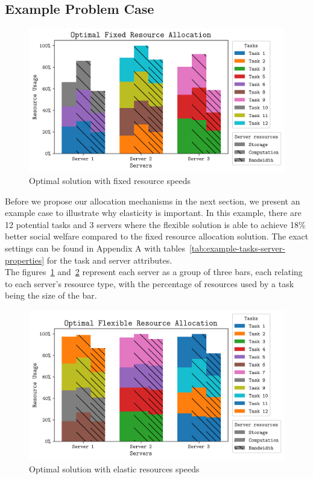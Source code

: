 \subsection{Example Problem Case}
\label{subsec:example-problem-case}
\begin{figure}
    \centering
    \includegraphics[width=\linewidth]{figs/allocation/optimal_fixed_resource_allocation.png}
    \caption{Optimal solution with fixed resource speeds}
    \label{fig:example-fixed-allocation}
\end{figure}
Before we propose our allocation mechanisms in the next section, we present an example case to illustrate
why elasticity is important. In this example, there are 12 potential tasks and 3 servers where the flexible solution
is able to achieve 18\% better social welfare compared to the fixed resource allocation solution.
The exact settings can be found in Appendix A with tables~\ref{tab:example-tasks-server-properties}
for the task and server attributes. \\
The figures~\ref{fig:example-fixed-allocation} and~\ref{fig:example-flexible-allocation} represent each server as a
group of three bars, each relating to each server's resource type, with the percentage of resources used by a task
being the size of the bar.

\begin{figure}
    \centering
    \includegraphics[width=0.5\linewidth]{figs/allocation/optimal_flexible_resource_allocation.png}
    \caption{Optimal solution with elastic resources speeds}
    \label{fig:example-flexible-allocation}
\end{figure}

